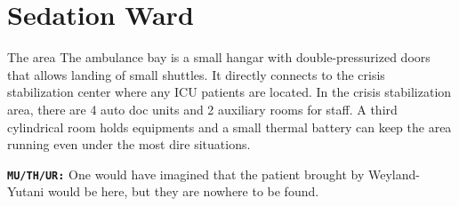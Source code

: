 \section{Sedation Ward}


\begin{rpg-commentbox}{The area}
    The ambulance bay is a small hangar with double-pressurized doors that allows landing of small shuttles. 
    It directly connects to the crisis stabilization center where any ICU patients are located. In the crisis stabilization area, there are 4 auto doc units and 2 auxiliary rooms for staff. A third 
    cylindrical room holds equipments and a small thermal battery can keep the area running even under the most dire situations.
    
    \texttt{\textbf{MU/TH/UR:}} One would have imagined that the patient brought by Weyland-Yutani would be here, but they are nowhere to be found.
\end{rpg-commentbox}  

